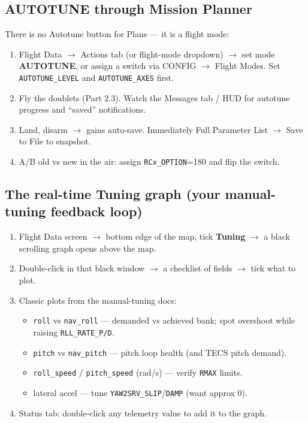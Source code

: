 \documentclass[11pt,a4paper]{article}
\newcommand{\pp}[1]{\texttt{#1}} %
\begin{document}
\subsection{AUTOTUNE through Mission Planner}
There is no Autotune button for Plane --- it is a flight mode:
\begin{enumerate}[leftmargin=1.6em]
  \item Flight Data $\rightarrow$ Actions tab (or flight-mode dropdown)
  $\rightarrow$ set mode \textbf{AUTOTUNE}, or assign a switch via CONFIG
  $\rightarrow$ Flight Modes. Set \pp{AUTOTUNE\_LEVEL} and \pp{AUTOTUNE\_AXES}
  first.
  \item Fly the doublets (Part 2.3). Watch the Messages tab / HUD for autotune
  progress and ``saved'' notifications.
  \item Land, disarm $\rightarrow$ gains auto-save. Immediately Full Parameter List
  $\rightarrow$ Save to File to snapshot.
  \item A/B old vs new in the air: assign \pp{RCx\_OPTION}=180 and flip the switch.
\end{enumerate}

\subsection{The real-time Tuning graph (your manual-tuning feedback loop)}
\begin{enumerate}[leftmargin=1.6em]
  \item Flight Data screen $\rightarrow$ bottom edge of the map, tick
  \textbf{Tuning} $\rightarrow$ a black scrolling graph opens above the map.
  \item Double-click in that black window $\rightarrow$ a checklist of fields
  $\rightarrow$ tick what to plot.
  \item Classic plots from the manual-tuning docs:
  \begin{itemize}[leftmargin=1.2em]
    \item \pp{roll} vs \pp{nav\_roll} --- demanded vs achieved bank; spot overshoot
    while raising \pp{RLL\_RATE\_P/D}.
    \item \pp{pitch} vs \pp{nav\_pitch} --- pitch loop health (and TECS pitch
    demand).
    \item \pp{roll\_speed} / \pp{pitch\_speed} (rad/s) --- verify \pp{RMAX} limits.
    \item lateral accel --- tune \pp{YAW2SRV\_SLIP}/\pp{DAMP} (want approx 0).
  \end{itemize}
  \item Status tab: double-click any telemetry value to add it to the graph.
\end{enumerate}
\end{document}

